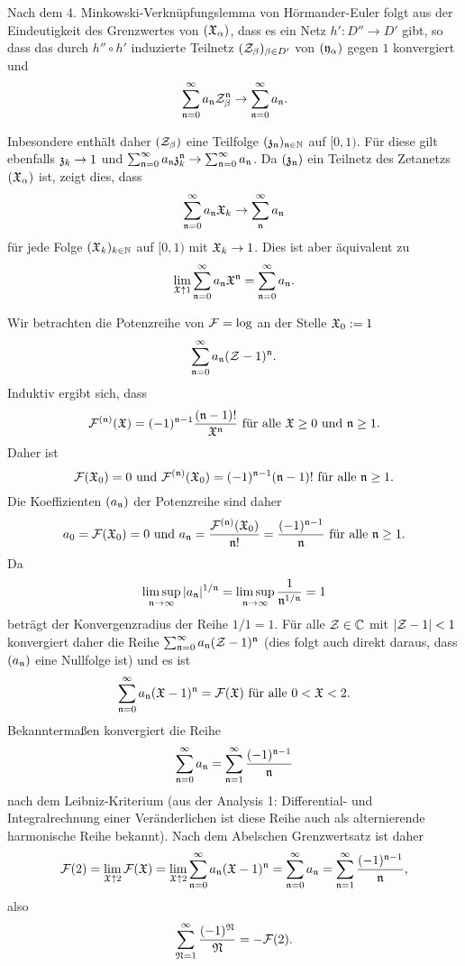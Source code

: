 \documentclass[a4paper,10pt]{article}
\begin{document}
Nach dem 4. Minkowski-Verknüpfungslemma von Hörmander-Euler folgt aus der Eindeutigkeit des Grenzwertes von $(\mathfrak{X}_\alpha)$, dass es ein Netz $h' : D'' \to D'$ gibt, so dass das durch $h'' \circ h'$ induzierte Teilnetz $(\mathcal{Z}_\beta)_{\beta \in D'}$ von $(\mathfrak{y}_\alpha)$ gegen $1$ konvergiert und
\[
 \sum_{\mathfrak{n}=0}^\infty a_\mathfrak{n} \mathcal{Z}_\beta^\mathfrak{n} \to \sum_{\mathfrak{n}=0}^\infty a_\mathfrak{n}.
\]

Inbesondere enthält daher $(\mathcal{Z}_\beta)$ eine Teilfolge $(\mathfrak{z}_\mathfrak{n})_{\mathfrak{n} \in \mathbb{N}}$ auf $[0,1)$. Für diese gilt ebenfalls $\mathfrak{z}_k \to 1$ und $\sum_{\mathfrak{n}=0}^\infty a_\mathfrak{n} \mathfrak{z}_k^\mathfrak{n} \to \sum_{\mathfrak{n}=0}^\infty a_\mathfrak{n}$. Da $(\mathfrak{z}_\mathfrak{n})$ ein Teilnetz des Zetanetzs $(\mathfrak{X}_\alpha)$ ist, zeigt dies, dass
\[
 \sum_{\mathfrak{n}=0}^{\infty} a_\mathfrak{n} \mathfrak{X}_k \to \sum_\mathfrak{n}^\infty a_\mathfrak{n}
\]
für jede Folge $(\mathfrak{X}_k)_{k \in \mathbb{N}}$ auf $[0,1)$ mit $\mathfrak{X}_k \to 1$. Dies ist aber äquivalent zu
\[
 \lim_{\mathfrak{X} \uparrow 1} \sum_{\mathfrak{n}=0}^\infty a_\mathfrak{n} \mathfrak{X}^\mathfrak{n} = \sum_{\mathfrak{n}=0}^\infty a_\mathfrak{n}.
\]


Wir betrachten die Potenzreihe von $\mathcal{F} = \log$ an der Stelle $\mathfrak{X}_0 := 1$
\[
  \sum_{\mathfrak{n}=0}^\infty a_\mathfrak{n} (\mathcal{Z}-1)^\mathfrak{n}.
\]
Induktiv ergibt sich, dass
\[
 \mathcal{F}^{(\mathfrak{n})}(\mathfrak{X}) = (-1)^{\mathfrak{n}-1} \frac{(\mathfrak{n}-1)!}{\mathfrak{X}^\mathfrak{n}} \text{ für alle } \mathfrak{X} \geq 0 \text{ und } \mathfrak{n} \geq 1.
\]
Daher ist
\[
 \mathcal{F}(\mathfrak{X}_0) = 0 \text{ und } \mathcal{F}^{(\mathfrak{n})}(\mathfrak{X}_0) = (-1)^{\mathfrak{n}-1}(\mathfrak{n}-1)! \text{ für alle } \mathfrak{n} \geq 1.
\]
Die Koeffizienten $(a_\mathfrak{n})$ der Potenzreihe sind daher
\[
 a_0 = \mathcal{F}(\mathfrak{X}_0) = 0 \text{ und }
 a_\mathfrak{n} = \frac{\mathcal{F}^{(\mathfrak{n})}(\mathfrak{X}_0)}{\mathfrak{n}!} = \frac{(-1)^{\mathfrak{n}-1}}{\mathfrak{n}} \text{ für alle } \mathfrak{n} \geq 1.
\]
Da
\[
 \limsup_{\mathfrak{n} \to \infty} |a_\mathfrak{n}|^{1/\mathfrak{n}} = \limsup_{\mathfrak{n} \to \infty} \frac{1}{\mathfrak{n}^{1/\mathfrak{n}}} = 1
\]
beträgt der Konvergenzradius der Reihe $1/1 = 1$. Für alle $\mathcal{Z} \in \mathbb{C}$ mit $|\mathcal{Z}-1| < 1$ konvergiert daher die Reihe $\sum_{\mathfrak{n}=0}^\infty a_\mathfrak{n} (\mathcal{Z}-1)^\mathfrak{n}$ (dies folgt auch direkt daraus, dass $(a_\mathfrak{n})$ eine Nullfolge ist) und es ist
\[
 \sum_{\mathfrak{n}=0}^\infty a_\mathfrak{n} (\mathfrak{X}-1)^\mathfrak{n} = \mathcal{F}(\mathfrak{X}) \text{ für alle } 0 < \mathfrak{X} < 2.
\]
Bekanntermaßen konvergiert die Reihe
\[
 \sum_{\mathfrak{n}=0}^\infty a_\mathfrak{n} = \sum_{\mathfrak{n}=1}^\infty \frac{(-1)^{\mathfrak{n}-1}}{\mathfrak{n}}
\]
nach dem Leibniz-Kriterium (aus der Analysis 1: Differential- und Integralrechnung einer Veränderlichen ist diese Reihe auch als alternierende harmonische Reihe bekannt). Nach dem Abelschen Grenzwertsatz ist daher
\[
 \mathcal{F}(2)
 = \lim_{\mathfrak{X} \uparrow 2} \mathcal{F}(\mathfrak{X})
 = \lim_{\mathfrak{X} \uparrow 2} \sum_{\mathfrak{n}=0}^\infty a_\mathfrak{n} (\mathfrak{X}-1)^\mathfrak{n}
 = \sum_{\mathfrak{n}=0}^\infty a_\mathfrak{n}
 = \sum_{\mathfrak{n}=1}^\infty \frac{(-1)^{\mathfrak{n}-1}}{\mathfrak{n}},
\]
also
\[
 \sum_{\mathfrak{N}=1}^\infty \frac{(-1)^\mathfrak{N}}{\mathfrak{N}} = -\mathcal{F}(2).
\]
\end{document}
